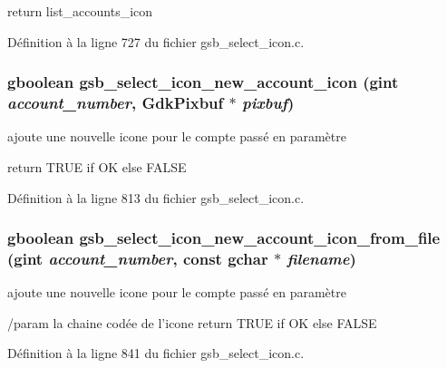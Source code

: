 return list\_\-accounts\_\-icon 

Définition à la ligne 727 du fichier gsb\_\-select\_\-icon.c.

\subsubsection[{gsb\_\-select\_\-icon\_\-new\_\-account\_\-icon}]{\setlength{\rightskip}{0pt plus 5cm}gboolean gsb\_\-select\_\-icon\_\-new\_\-account\_\-icon (gint {\em account\_\-number}, \/  GdkPixbuf $\ast$ {\em pixbuf})}\label{gsb__select__icon_8h_a8dd950442da88096e64568acd27675b5}
ajoute une nouvelle icone pour le compte passé en paramètre

return TRUE if OK else FALSE 

Définition à la ligne 813 du fichier gsb\_\-select\_\-icon.c.

\subsubsection[{gsb\_\-select\_\-icon\_\-new\_\-account\_\-icon\_\-from\_\-file}]{\setlength{\rightskip}{0pt plus 5cm}gboolean gsb\_\-select\_\-icon\_\-new\_\-account\_\-icon\_\-from\_\-file (gint {\em account\_\-number}, \/  const gchar $\ast$ {\em filename})}\label{gsb__select__icon_8h_a3f81b2b7b83a4137cf42f373ca0ec0a8}
ajoute une nouvelle icone pour le compte passé en paramètre

/param la chaine codée de l'icone return TRUE if OK else FALSE 

Définition à la ligne 841 du fichier gsb\_\-select\_\-icon.c.

